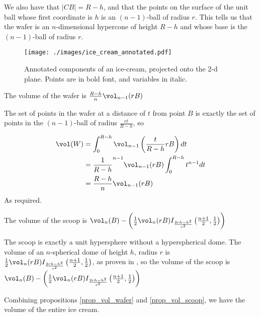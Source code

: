 We also have that $|CB| = R-h$, and that the points on the surface of the unit ball whose first coordinate is $h$ is an $(n-1)$-ball of radius $r$. This tells us that the wafer is an $n$-dimensional hypercone of height $R-h$ and whose base is the $(n-1)$-ball of radius $r$.

\begin{figure}
\centering
\texttt{[image: ./images/ice\_cream\_annotated.pdf]}
\caption{Annotated components of an ice-cream, projected onto the 2-d plane. Points are in bold font, and variables in italic.}
\label{fig_ice_cream_annotated}
\end{figure}

\begin{proposition} \label{prop_vol_wafer}
The volume of the wafer is $\frac{R-h}{n} \vol_{n-1}(rB)$
\end{proposition}

The set of points in the wafer at a distance of $t$ from point $B$ is exactly the set of points in the $(n-1)$-ball of radius $\frac{rt}{R-h}$, so

\begin{align*}
\vol(W)
&= \int^{R-h}_{0} \vol_{n-1}\left(\frac{t}{R-h}rB\right) dt \\
&= \frac{1}{R-h}^{n-1} \vol_{n-1}(rB) \int^{R-h}_0 t^{n-1}dt \\
&= \frac{R-h}{n} \vol_{n-1}(rB)
\end{align*}
As required.

\begin{proposition} \label{prop_vol_scoop}
The volume of the scoop is $\vol_n(B) - \left(\frac{1}{2}\vol_n(rB) I_{\frac{2rh-h^2}{r^2}}\left(\frac{n+1}{2}, \frac{1}{2}\right)\right)$
\end{proposition}

The scoop is exactly a unit hypersphere without a hyperspherical dome. The volume of an $n$-spherical dome of height $h$, radius $r$ is $\frac{1}{2}\vol_n(rB) I_{\frac{2rh-h^2}{r^2}}\left(\frac{n+1}{2}, \frac{1}{2}\right)$, as proven in %
, so the volume of the scoop is $\vol_n(B) - \left(\frac{1}{2}\vol_n(rB) I_{\frac{2rh-h^2}{r^2}}\left(\frac{n+1}{2}, \frac{1}{2}\right)\right)$

Combining propositions \ref{prop_vol_wafer} and \ref{prop_vol_scoop}, we have the volume of the entire ice cream.